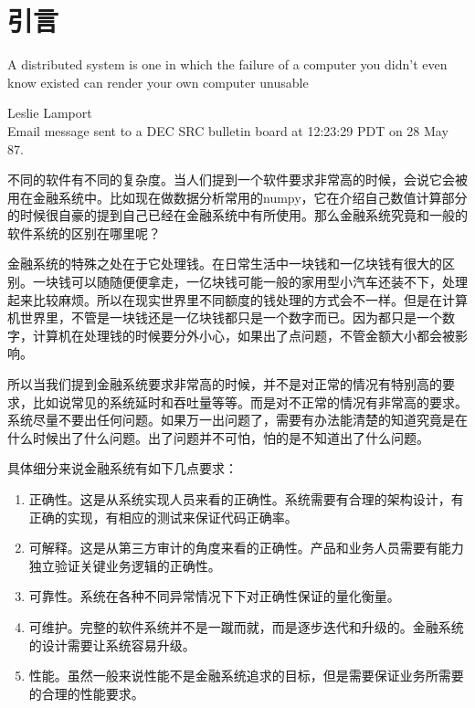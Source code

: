 \chapter*{引言}


\epigraph{A distributed system is one in which the failure of a computer you didn't even know existed can render your own computer unusable}{Leslie Lamport \\ Email message sent to a DEC SRC bulletin board at 12:23:29 PDT on 28 May 87.}


不同的软件有不同的复杂度。当人们提到一个软件要求非常高的时候，会说它会被用在金融系统中。比如现在做数据分析常用的numpy，它在介绍自己数值计算部分的时候很自豪的提到自己已经在金融系统中有所使用。那么金融系统究竟和一般的软件系统的区别在哪里呢？

金融系统的特殊之处在于它处理钱。在日常生活中一块钱和一亿块钱有很大的区别。一块钱可以随随便便拿走，一亿块钱可能一般的家用型小汽车还装不下，处理起来比较麻烦。所以在现实世界里不同额度的钱处理的方式会不一样。但是在计算机世界里，不管是一块钱还是一亿块钱都只是一个数字而已。因为都只是一个数字，计算机在处理钱的时候要分外小心，如果出了点问题，不管金额大小都会被影响。

所以当我们提到金融系统要求非常高的时候，并不是对正常的情况有特别高的要求，比如说常见的系统延时和吞吐量等等。而是对不正常的情况有非常高的要求。系统尽量不要出任何问题。如果万一出问题了，需要有办法能清楚的知道究竟是在什么时候出了什么问题。出了问题并不可怕，怕的是不知道出了什么问题。

具体细分来说金融系统有如下几点要求：
\begin{enumerate}
    \item 正确性。这是从系统实现人员来看的正确性。系统需要有合理的架构设计，有正确的实现，有相应的测试来保证代码正确率。
    \item 可解释。这是从第三方审计的角度来看的正确性。产品和业务人员需要有能力独立验证关键业务逻辑的正确性。
    \item 可靠性。系统在各种不同异常情况下下对正确性保证的量化衡量。
    \item 可维护。完整的软件系统并不是一蹴而就，而是逐步迭代和升级的。金融系统的设计需要让系统容易升级。
    \item 性能。虽然一般来说性能不是金融系统追求的目标，但是需要保证业务所需要的合理的性能要求。
\end{enumerate}

